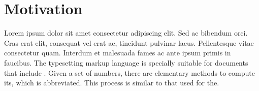 \documentclass[./main_en.tex]{subfiles}
\begin{document}
\chapter{Motivation}
\par Lorem ipsum dolor sit amet consectetur adipiscing elit. Sed ac bibendum orci. Cras erat elit, consequat vel erat ac, tincidunt pulvinar lacus. Pellentesque vitae consectetur quam. Interdum et malesuada fames ac ante ipsum primis in faucibus. The typesetting markup language is specially suitable for documents that include . Given a set of numbers, there are elementary methods to compute its, which is abbreviated. This process is similar to that used for the.
\end{document}
